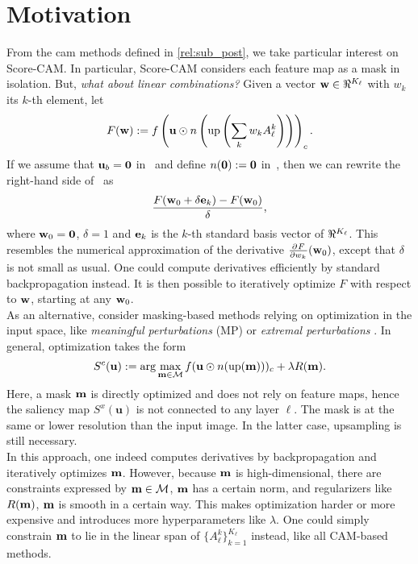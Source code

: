 \section{Motivation}
\label{sec:oc_motiv}
From the \gls{cam} methods defined in \autoref{rel:sub_post}, we take particular interest on 
Score-CAM. In particular, Score-CAM considers each feature map as a mask in isolation. But, 
\emph{what about linear combinations?}
Given a vector $\vw \in \real^{K_\ell}$ with $w_k$ its $k$-th element, let
\begin{equation}
	F(\mathbf{w}) \mathrel{:=} f \left( \mathbf{u} \odot n \left( \operatorname{up} \left(
		\displaystyle\sum_k w_k A^k_\ell
	\right) \right) \right)_c.
\label{eq:s-obj}
\end{equation}
If we assume that $\mathbf{u}_b = \mathbf{0}$ in~ and define $n(\mathbf{0}) \mathrel{:=} \mathbf{0}$ 
in~, then we can rewrite the right-hand side of~ as
\begin{equation}	
	\frac{F(\mathbf{w}_0 + \delta \mathbf{e}_k) - F(\mathbf{w}_0)}{\delta},
\label{eq:s-cam2}
\end{equation}
where $\mathbf{w}_0 = \mathbf{0}$, $\delta = 1$ and $\mathbf{e}_k$ is the $k$-th standard basis vector of 
$\real^{K_\ell}$. This resembles the numerical approximation of the derivative 
$\frac{\partial^{}{F}}{\partial{{w_k}^{}}}(\mathbf{w}_0)$, except that $\delta$ is not small as usual. One could compute derivatives 
efficiently by standard backpropagation instead. It is then possible to iteratively optimize $F$ 
with respect to $\mathbf{w}$, starting at any $\mathbf{w}_0$.\\

\noindent As an alternative, consider masking-based methods relying on optimization in the input 
space, like \emph{meaningful perturbations} (MP) \parencite{fong2017interpretable} or \emph{extremal 
perturbations} \parencite{fong2019understanding}. In general, optimization takes the form
\begin{equation}
	S^c(\mathbf{u}) \mathrel{:=} \arg\max_{\mathbf{m} \in \mathcal{M}} f(\mathbf{u} \odot n(\operatorname{up}(\mathbf{m})))_c + \lambda R(\mathbf{m}).
\label{eq:mask}
\end{equation}
Here, a mask $\mathbf{m}$ is directly optimized and does not rely on feature maps, hence the saliency 
map $S^x(\mathbf{u})$ is not connected to any layer $\ell$. The mask is at the same or lower 
resolution than the input image. In the latter case, upsampling is still necessary.\\

\noindent In this approach, one indeed computes derivatives by backpropagation and iteratively 
optimizes $\mathbf{m}$. However, because $\mathbf{m}$ is high-dimensional, there are constraints expressed by 
$\mathbf{m} \in \mathcal{M}$, \eg $\mathbf{m}$ has a certain norm, and regularizers like $R(\mathbf{m})$, \eg $\mathbf{m}$ is smooth in 
a certain way. This makes optimization harder or more expensive and introduces more hyperparameters 
like $\lambda$. One could simply constrain $\mathbf{m}$ to lie in the linear span of $\{A_\ell^k\}_{k=1}
^{K_\ell}$ instead, like all CAM-based methods.

